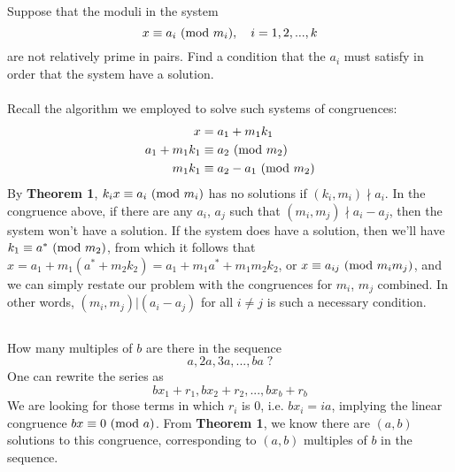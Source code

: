 \documentclass{article}
\begin{document}
\subsection{}
Suppose that the moduli in the system
\begin{equation*}
    x \equiv a_i \ (\mathrm{mod}\ m_i), \quad i = 1, 2, ..., k
\end{equation*}
are not relatively prime in pairs.
Find a condition that the $a_i$ must satisfy in order that the system
have a solution.\\~\\
Recall the algorithm we employed to solve such systems of congruences:
\begin{align*}
    x &= a_1 + m_1k_1\\
    a_1 + m_1k_1 &\equiv a_2 \ (\mathrm{mod}\ m_2)\\
    m_1k_1 &\equiv a_2 - a_1 \ (\mathrm{mod}\ m_2)
\end{align*}
By \textbf{Theorem 1}, $k_ix \equiv a_i \ (\mathrm{mod}\ m_i)$ has no solutions
if $(k_i, m_i) \nmid a_i$.
In the congruence above, if there are any $a_i$, $a_j$ such that
$(m_i, m_j) \nmid a_i - a_j$, then the system won't have a solution.
If the system does have a solution, then we'll have
$k_1 \equiv a^{*} \ (\mathrm{mod}\ m_2)$, from which it follows that
$x = a_1 + m_1(a^{*} + m_2k_2) = a_1 + m_1a^{*} + m_1m_2k_2$,
or $x \equiv a_{ij} \ (\mathrm{mod}\ m_im_j)$,
and we can simply restate our problem with the congruences for $m_i$, $m_j$
combined.
In other words, $(m_i, m_j)|(a_i - a_j)$ for all $i \neq j$ is such
a necessary condition.

\subsection{}
How many multiples of $b$ are there in the sequence
\begin{equation*}
    a, 2a, 3a, ..., ba \; ?
\end{equation*}
One can rewrite the series as
\begin{equation*}
    bx_1 + r_1, bx_2 + r_2, ..., bx_b + r_b
\end{equation*}
We are looking for those terms in which $r_i$ is 0, i.e.
$bx_i = ia$, implying the linear congruence $bx \equiv 0 \ (\mathrm{mod}\ a)$.
From \textbf{Theorem 1}, we know there are $(a, b)$ solutions to this
congruence, corresponding to $(a, b)$ multiples of $b$ in the sequence.
\end{document}

